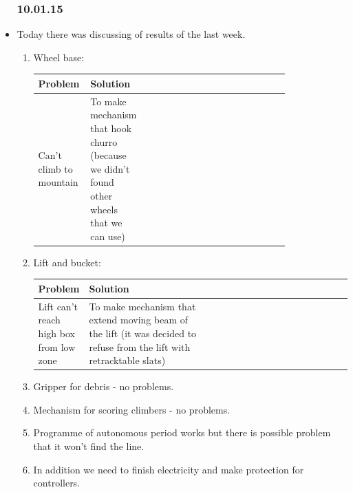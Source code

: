 \begin{itemize}
	\subsubsection{10.01.15}
		\item Today there was discussing of results of the last week.
		\begin{enumerate}
			\item Wheel base:
			\begin{table}[H]
				\vspace{-2mm}
				\begin{center}
					\begin{tabular}{|p{0.15\linewidth}|p{0.1\linewidth}|p{0.55\linewidth}}
						\hline
						Problem & Solution\\
						\hline
						Can't climb to mountain  &  To make mechanism that hook churro (because we didn't found other wheels that we can use)\\	
						\hline
					\end{tabular}
				\end{center}
			\end{table}
			\item Lift and bucket:
			\begin{table}[H]
				\vspace{-2mm}
				\begin{center}
					\begin{tabular}{|p{0.15\linewidth}|p{0.4\linewidth}|p{0.55\linewidth}}
						\hline
						Problem & Solution\\
						\hline
						Lift can't reach high box from low zone & To make mechanism that extend moving beam of the lift (it was decided to refuse from the lift with retracktable slats)\\
						\hline
					\end{tabular}
				\end{center}
			\end{table}
			\item Gripper for debris - no problems.
			
			\item Mechanism for scoring climbers - no problems.
			
			\item Programme of autonomous period works but there is possible problem that it won't find the line.
			
			\item In addition we need to finish electricity and make protection for controllers.
			

\end{enumerate}
\end{itemize}
